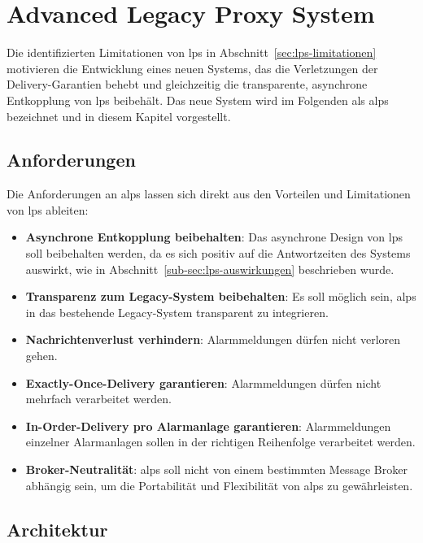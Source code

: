 \chapter{Advanced Legacy Proxy System}
\label{ch:alps}

Die identifizierten Limitationen von \gls{lps} in Abschnitt~\ref{sec:lps-limitationen} motivieren die Entwicklung eines neuen Systems, das die Verletzungen der Delivery-Garantien behebt und gleichzeitig die transparente, asynchrone Entkopplung von \gls{lps} beibehält. Das neue System wird im Folgenden als \gls{alps} bezeichnet und in diesem Kapitel vorgestellt.

\section{Anforderungen}
\label{sec:alps-anforderungen}

Die Anforderungen an \gls{alps} lassen sich direkt aus den Vorteilen und Limitationen von \gls{lps} ableiten:

\begin{itemize}
    \item \textbf{Asynchrone Entkopplung beibehalten}: Das asynchrone Design von \gls{lps} soll beibehalten werden, da es sich positiv auf die Antwortzeiten des Systems auswirkt, wie in Abschnitt~\ref{sub-sec:lps-auswirkungen} beschrieben wurde.
    \item \textbf{Transparenz zum Legacy-System beibehalten}: Es soll möglich sein, \gls{alps} in das bestehende Legacy-System transparent zu integrieren.
    \item \textbf{Nachrichtenverlust verhindern}: Alarmmeldungen dürfen nicht verloren gehen.
    \item \textbf{Exactly-Once-Delivery garantieren}: Alarmmeldungen dürfen nicht mehrfach verarbeitet werden.
    \item \textbf{In-Order-Delivery pro Alarmanlage garantieren}: Alarmmeldungen einzelner Alarmanlagen sollen in der richtigen Reihenfolge verarbeitet werden.
    \item \textbf{Broker-Neutralität}: \gls{alps} soll nicht von einem bestimmten Message Broker abhängig sein, um die Portabilität und Flexibilität von \gls{alps} zu ge\-währ\-leis\-ten.
\end{itemize}

\newpage

\section{Architektur}
\label{sec:alps-architektur}


